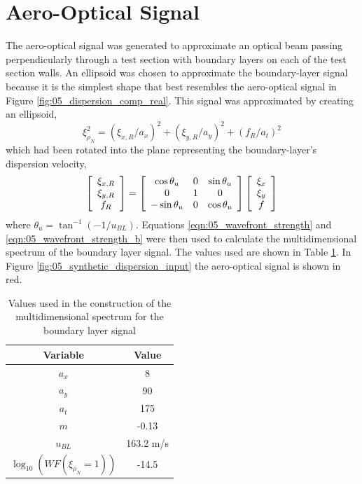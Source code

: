 \section{Aero-Optical Signal}
The aero-optical signal was generated to approximate an optical beam passing perpendicularly through a test section with boundary layers on each of the test section walls.
An ellipsoid was chosen to approximate the boundary-layer signal because it is the simplest shape that best resembles the aero-optical signal in Figure \ref{fig:05_dispersion_comp_real}.
This signal was approximated by creating an ellipsoid,
\begin{equation}
  \xi_{\rho_N}^2 = (\xi_{x,R}/a_x)^2+(\xi_{y,R}/a_y)^2+(f_R/a_t)^2
\end{equation}
which had been rotated into the plane representing the boundary-layer's dispersion velocity,
\begin{equation}
  \left[\begin{array}{c} \xi_{x,R} \\ \xi_{y,R} \\ f_R \end{array}\right] = \left[\begin{array}{c c c} \cos\theta_u & 0 & \sin\theta_u \\ 0 & 1 & 0 \\ -\sin\theta_u & 0 & \cos\theta_u \end{array}\right]\left[\begin{array}{c} \xi_{x} \\ \xi_{y} \\ f \end{array}\right]
\end{equation}
where $\theta_u=\tan^{-1}(-1/u_{BL})$.
Equations \ref{eqn:05_wavefront_strength} and \ref{eqn:05_wavefront_strength_b} were then used to calculate the multidimensional spectrum of the boundary layer signal.
The values used are shown in Table \ref{tab:05_boundary_layer}.
In Figure \ref{fig:05_synthetic_dispersion_input} the aero-optical signal is shown in red.
\begin{table}
  \centering
  \caption{Values used in the construction of the multidimensional spectrum for the boundary layer signal}
  \begin{tabular}{c c}
    Variable & Value \\
    \hline \hline
    $a_x$ & 8 \\
    $a_y$ & 90 \\
    $a_t$ & 175 \\
    $m$ & -0.13 \\
    $u_{BL}$ & 163.2 m/s \\
    $\log_{10}(WF(\xi_{\rho_N}=1))$ & -14.5
  \end{tabular}
  \label{tab:05_boundary_layer}
\end{table}

